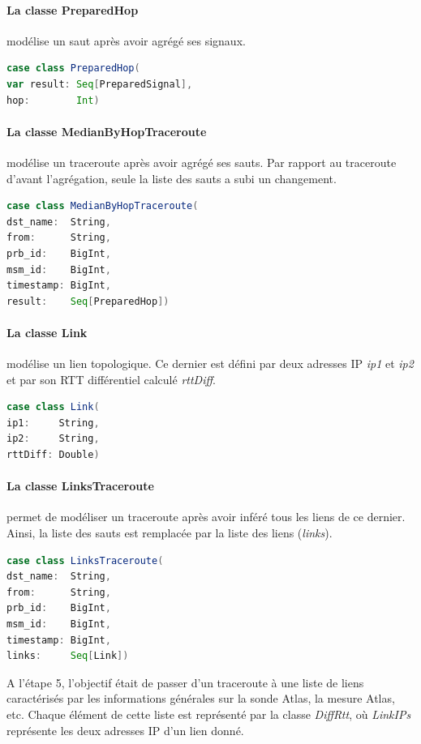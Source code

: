\paragraph{La classe PreparedHop } modélise un saut après avoir agrégé ses signaux. 
\begin{lstlisting}[language=scala]
case class PreparedHop(
var result: Seq[PreparedSignal],
hop:        Int)
\end{lstlisting}


\paragraph{La classe MedianByHopTraceroute } modélise un traceroute après avoir agrégé ses sauts. Par rapport au traceroute d'avant l'agrégation, seule la liste des sauts  a subi un changement. 
\begin{lstlisting}[language=scala]
case class MedianByHopTraceroute(
dst_name:  String,
from:      String,
prb_id:    BigInt,
msm_id:    BigInt,
timestamp: BigInt,
result:    Seq[PreparedHop])
\end{lstlisting}


\paragraph{La classe Link} modélise un lien topologique. Ce dernier est défini par deux adresses IP  \textit{ip1} et \textit{ip2} et par son RTT différentiel calculé \textit{rttDiff}.
\begin{lstlisting}[language=scala]
case class Link(
ip1:     String,
ip2:     String,
rttDiff: Double)
\end{lstlisting}

\paragraph{La classe LinksTraceroute} permet de modéliser un traceroute après avoir inféré tous les liens de ce dernier. Ainsi, la liste des sauts est remplacée par la liste des liens (\textit{links}). 

\begin{lstlisting}[language=scala]
case class LinksTraceroute(
dst_name:  String,
from:      String,
prb_id:    BigInt,
msm_id:    BigInt,
timestamp: BigInt,
links:     Seq[Link])
\end{lstlisting}


A l'étape 5, l'objectif était de passer d'un traceroute à une liste de liens caractérisés par les informations générales sur la sonde Atlas, la mesure Atlas, etc. Chaque élément de cette liste est représenté par la classe \textit{DiffRtt}, où \textit{LinkIPs} représente les deux adresses IP d'un lien donné.
